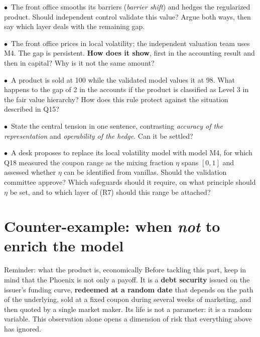 \documentclass[11pt,a4paper]{article}
\newcommand{\team}{\textcolor{teamblue}{$\bullet$}}
\begin{document}
\begin{questions}[resume]
  \item \team\ The front office smooths its barriers (\emph{barrier shift}) and hedges the regularized product. Should
  independent control validate this value? Argue both ways, then say which layer deals with the
  remaining gap.

  \item \team\ The front office prices in local volatility; the independent valuation team uses M4. The gap is
  persistent. \textbf{How does it show}, first in the accounting result and then in capital? Why is it
  not the same amount?

  \item \team\ A product is sold at 100 while the validated model values it at 98. What happens to the gap
  of 2 in the accounts if the product is classified as Level 3 in the fair value hierarchy? How does
  this rule protect against the situation described in Q15?

  \item \team\ State the central tension in one sentence, contrasting \emph{accuracy of the representation} and \emph{operability of the hedge}. Can it be settled?

  \item \team\ A desk proposes to replace its local volatility model with model M4, for which Q18 measured
  the coupon range as the mixing fraction $\eta$ spans $[0,1]$ and assessed whether $\eta$ can be identified
  from vanillas. Should the validation committee approve? Which safeguards should it require,
  on what principle should $\eta$ be set, and to which layer of (R7) should this range be attached?
\end{questions}

\section{Counter-example: when \emph{not} to enrich the model}

\begin{greybox}{Reminder: what the product is, economically}
Before tackling this part, keep in mind that the Phoenix is not only a payoff. It is a \textbf{debt security}
issued on the issuer's funding curve, \textbf{redeemed at a random date} that depends on the path of
the underlying, sold at a fixed coupon during several weeks of marketing, and then quoted by a
single market maker. Its life is not a parameter: it is a random variable. This observation alone
opens a dimension of risk that everything above has ignored.
\end{greybox}
\end{document}
